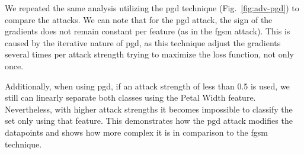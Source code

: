 We repeated the same analysis utilizing the \ac{pgd}
technique (Fig.~\ref{fig:adv-pgd}) to compare the attacks.
We can note that for the \ac{pgd} attack, the sign
of the gradients does not remain constant per
feature (as in the \ac{fgsm} attack). This is caused
by the iterative nature of \ac{pgd}, as this technique
adjust the gradients several times per attack strength
trying to maximize the loss function, not only once. \

Additionally, when using \ac{pgd}, if an attack
strength of less than 0.5 is used, we still can
linearly separate both classes using the Petal Width
feature. Nevertheless, with higher attack strengths
it becomes impossible to classify the set only using
that feature. This demonstrates how the \ac{pgd}
attack modifies the datapoints and shows how more
complex it is in comparison to the \ac{fgsm} technique. \

